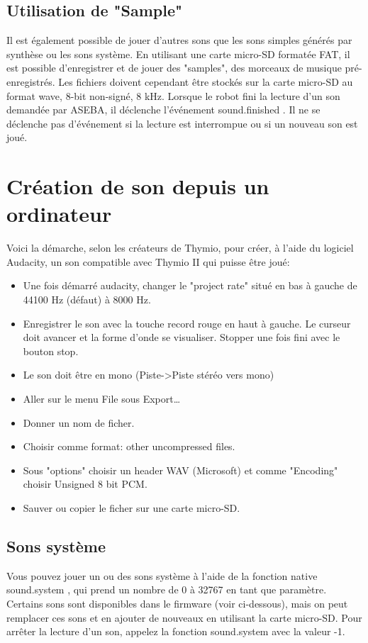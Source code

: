 \documentclass[a4paper, 12pt]{report}
\begin{document}
\subsection{Utilisation de "Sample"}
Il est également possible de jouer d'autres sons que les sons simples générés par synthèse ou les sons système. En utilisant une carte micro-SD formatée FAT, il est possible d'enregistrer et de jouer des "samples", des morceaux de musique pré-enregistrés. Les fichiers doivent cependant être stockés sur la carte micro-SD au format wave, 8-bit non-signé, 8 kHz. Lorsque le robot fini la lecture d'un son demandée par ASEBA, il déclenche l'événement sound.finished . Il ne se déclenche pas d'événement si la lecture est interrompue ou si un nouveau son est joué.\\

\section{Création de son depuis un ordinateur}
Voici la démarche, selon les créateurs de Thymio, pour créer, à l'aide du logiciel Audacity, un son compatible avec Thymio II qui puisse être joué:\\
\begin{itemize}
\item Une fois démarré audacity, changer le "project rate" situé en bas à gauche de 44100 Hz (défaut) à 8000 Hz.
\item Enregistrer le son avec la touche record rouge en haut à gauche. Le curseur doit avancer et la forme d'onde se visualiser. Stopper une fois fini avec le bouton stop.
\item Le son doit être en mono (Piste->Piste stéréo vers mono)
\item Aller sur le menu File sous Export…
\item Donner un nom de ficher.
\item Choisir comme format: other uncompressed files.
\item Sous "options" choisir un header WAV (Microsoft) et comme "Encoding" choisir Unsigned 8 bit PCM.
\item Sauver ou copier le ficher sur une carte micro-SD.
\end{itemize}

\subsection{Sons système}
Vous pouvez jouer un ou des sons système à l'aide de la fonction native sound.system , qui prend un nombre de 0 à 32767 en tant que paramètre. Certains sons sont disponibles dans le firmware (voir ci-dessous), mais on peut remplacer ces sons et en ajouter de nouveaux en utilisant la carte micro-SD. Pour arrêter la lecture d'un son, appelez la fonction sound.system avec la valeur -1.
\end{document}
